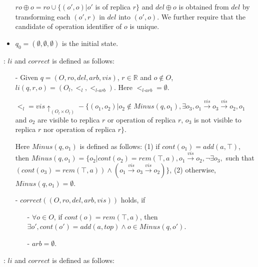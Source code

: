 \begin{itemize}
\begin {itemize}
     $ro \oplus o = ro \cup \{ (o',o) \vert o'$ is of replica $r \}$ and $del \oplus o$ is obtained from $del$ by transforming each $(o',r)$ in $del$ into $(o',o)$. We further require that the candidate of operation identifier of $o$ is unique.
    \end{itemize}

\item[-] $q_0=(\emptyset,\emptyset,\emptyset)$ is the initial state.
\end{itemize}

: $li$ and $correct$ is defined as follows:

\begin{itemize}
\setlength{\itemsep}{0.5pt}
\item[-] Given $q = (O,ro,del,arb,vis)$, $r \in \mathbb{R}$ and $o \notin O$, $li(q,r,o) = ( O_l ,<_l, <_{\textit{l-arb}} )$. Here $<_{\textit{l-arb}} = \emptyset$.

$<_l = vis \uparrow_{(O_l \times O_l)} - \{ (o_1,o_2) \vert o_2 \notin Minus(q,o_1), \exists o_3, o_1 {\xrightarrow{vis}} o_3 {\xrightarrow{vis}} o_2, o_1$ and $o_2$ are visible to replica $r$ or operation of replica $r$, $o_3$ is not visible to replica $r$ nor operation of replica $r\}$.

Here $Minus(q,o_1)$ is defined as follows: (1) if $cont(o_1)=add(a,\top)$, then $Minus(q,o_1) = \{o_2 \vert cont(o_2)=rem(\top,a), o_1 {\xrightarrow{vis}} o_2, \neg \exists o_3,$ such that $( cont(o_3) = rem(\top,a) ) \wedge ( o_1 {\xrightarrow{vis}} o_3 {\xrightarrow{vis}} o_2 ) \}$, (2) otherwise, $Minus(q,o_1) = \emptyset$.

\item[-] $correct((O,ro,del,arb,vis))$ holds, if

    \begin{itemize}
    \setlength{\itemsep}{0.5pt}
    \item[-] $\forall o \in O$, if $cont(o)=rem(\top,a)$, then $\exists o', cont(o')=add(a,top) \wedge o \in Minus(q,o')$.

    \item[-] $arb= \emptyset$.
    \end{itemize}
\end{itemize}

: $li$ and $correct$ is defined as follows:

